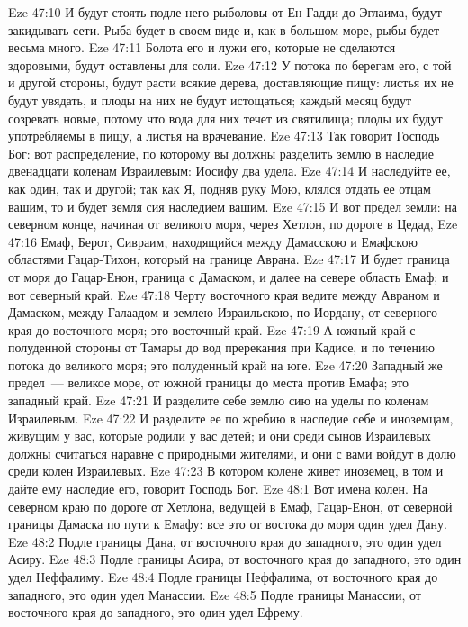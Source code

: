 \vs Eze 47:10 И будут стоять подле него рыболовы от Ен-Гадди до Эглаима, будут закидывать сети. Рыба будет в своем виде и, как в большом море, рыбы будет весьма много.
\vs Eze 47:11 Болота его и лужи его, которые не сделаются здоровыми, будут оставлены для соли.
\vs Eze 47:12 У потока по берегам его, с той и другой стороны, будут расти всякие дерева, доставляющие пищу: листья их не будут увядать, и плоды на них не будут истощаться; каждый месяц будут созревать новые, потому что вода для них течет из святилища; плоды их будут употребляемы в пищу, а листья на врачевание.
\rsbpar\vs Eze 47:13 Так говорит Господь Бог: вот распределение, по которому вы должны разделить землю в наследие двенадцати коленам Израилевым: Иосифу два удела.
\vs Eze 47:14 И наследуйте ее, как один, так и другой; так как Я, подняв руку Мою, клялся отдать ее отцам вашим, то и будет земля сия наследием вашим.
\vs Eze 47:15 И вот предел земли: на северном конце, начиная от великого моря, через Хетлон, по дороге в Цедад,
\vs Eze 47:16 Емаф, Берот, Сивраим, находящийся между Дамасскою и Емафскою областями Гацар-Тихон, который на границе Аврана.
\vs Eze 47:17 И будет граница от моря до Гацар-Енон, граница с Дамаском, и далее на севере область Емаф; и вот северный край.
\vs Eze 47:18 Черту восточного края ведите между Авраном и Дамаском, между Галаадом и землею Израильскою, по Иордану, от северного края до восточного моря; это восточный край.
\vs Eze 47:19 А южный край с полуденной стороны от Тамары до вод пререкания при Кадисе, и по течению потока до великого моря; это полуденный край на юге.
\vs Eze 47:20 Западный же предел~--- великое море, от южной границы до места против Емафа; это западный край.
\vs Eze 47:21 И разделите себе землю сию на уделы по коленам Израилевым.
\vs Eze 47:22 И разделите ее по жребию в наследие себе и иноземцам, живущим у вас, которые родили у вас детей; и они среди сынов Израилевых должны считаться наравне с природными жителями, и они с вами войдут в долю среди колен Израилевых.
\vs Eze 47:23 В котором колене живет иноземец, в том и дайте ему наследие его, говорит Господь Бог.
\vs Eze 48:1 Вот имена колен. На северном краю по дороге от Хетлона, ведущей в Емаф, Гацар-Енон, от северной границы Дамаска по пути к Емафу: все это от востока до моря один удел Дану.
\vs Eze 48:2 Подле границы Дана, от восточного края до западного, это один удел Асиру.
\vs Eze 48:3 Подле границы Асира, от восточного края до западного, это один удел Неффалиму.
\vs Eze 48:4 Подле границы Неффалима, от восточного края до западного, это один удел Манассии.
\vs Eze 48:5 Подле границы Манассии, от восточного края до западного, это один удел Ефрему.
